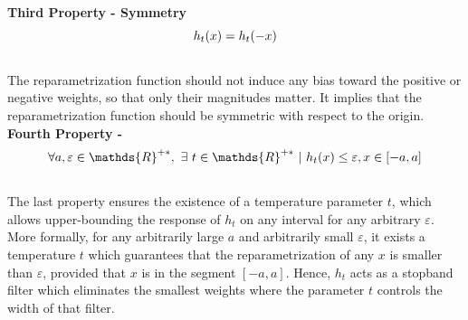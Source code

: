 \noindent\textbf{Third Property - Symmetry} \\

\begin{equation}
    \centering
    h_t(x) = h_t(-x)
    \label{eqn:chap1:reparam_prop3}
\end{equation}
\\
The reparametrization function should not induce any bias toward the positive or
negative weights, so that only their magnitudes matter. It implies that the
reparametrization function should be symmetric with respect to the origin.\\


\noindent\textbf{Fourth Property - } \\

\begin{equation}
    \centering
    \forall a,\varepsilon \in\mathds{R}^{+\ast},~ \exists ~t
    \in\mathds{R}^{+\ast} ~ | ~ h_t(x) \leq \varepsilon, x \in [-a,a]
    \label{eqn:chap1:reparam_prop4}
\end{equation}
\\
The last property ensures the existence of a temperature parameter $t$, which
allows upper-bounding the response of $h_t$ on any interval for any arbitrary
$\varepsilon$. More formally, for any arbitrarily large $a$ and arbitrarily
small $\varepsilon$, it exists a temperature $t$ which guarantees that the
reparametrization of any $x$ is smaller than $\varepsilon$, provided that $x$ is
in the segment $[-a, a]$. Hence, $h_t$ acts as a stopband filter which
eliminates the smallest weights where the parameter $t$ controls the width of
that filter. \\



